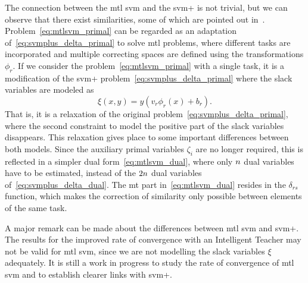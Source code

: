 The connection between the \acrshort{mtl} \acrshort{svm} and the \acrshort{svm}+ is not trivial, but we can observe that there exist similarities, some of which are pointed out in~\cite{LiangC08}. Problem~\eqref{eq:mtlsvm_primal} can be regarded as an adaptation of~\eqref{eq:svmplus_delta_primal} to solve \acrshort{mtl} problems, where different tasks are incorporated and multiple correcting spaces are defined using the transformations $\phi_r$.
If we consider the problem~\eqref{eq:mtlsvm_primal} with a single task, it is a modification of the \acrshort{svm}+ problem~\eqref{eq:svmplus_delta_primal} where the slack variables are modeled as
$$ \xi(x, y) = y (v_r \phi_r(x) + b_r)  .$$
That is, it is a relaxation of the original problem~\eqref{eq:svmplus_delta_primal}, where the second constraint to model the positive part of the slack variables disappears.
This relaxation gives place to some important differences between both models. Since the auxiliary primal variables $\zeta_i$ are no longer required, this is reflected in a simpler dual form~\eqref{eq:mtlsvm_dual}, where only $n$ dual variables have to be estimated, instead of the $2n$ dual variables of~\eqref{eq:svmplus_delta_dual}.
The \acrshort{mt} part in~\eqref{eq:mtlsvm_dual} resides in the $\delta_{rs}$ function, which makes the correction of similarity only possible between elements of the same task.
%

A major remark can be made about the differences between \acrshort{mtl} \acrshort{svm} and \acrshort{svm}+. The results for the improved rate of convergence with an Intelligent Teacher may not be valid for \acrshort{mtl} \acrshort{svm}, since we are not modelling the slack variables $\xi$ adequately. 
It is still a work in progress to study the rate of convergence of \acrshort{mtl} \acrshort{svm} and to establish clearer links with \acrshort{svm}+.













































